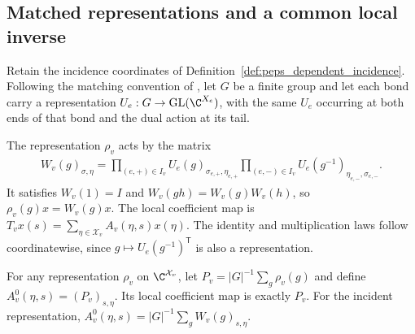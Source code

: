 \subsection{Matched representations and a common local inverse}
\label{sec:peps_dependent_projectors}

Retain the incidence coordinates of Definition~\ref{def:peps_dependent_incidence}.
Following the matching convention of \cite[Definition~5.1]{Schuch2010PEPS},
let $G$ be a finite group and let each bond carry a representation
$U_e:G\to\operatorname{GL}(\C^{X_e})$, with the same $U_e$ occurring at both
ends of that bond and the dual action at its tail.

\begin{definition}%
    \label{def:peps_dependent_incident_action}
    \leanok
    The representation $\rho_v$ acts by the matrix
    \begin{align}
        W_v(g)_{\sigma,\eta}
        =\prod_{(e,+)\in I_v}U_e(g)_{\sigma_{e,+},\eta_{e,+}}
        \prod_{(e,-)\in I_v}U_e(g^{-1})_{\eta_{e,-},\sigma_{e,-}}.
        \label{eq:peps_dependent_incident_action}
    \end{align}
    It satisfies $W_v(1)=I$ and $W_v(gh)=W_v(g)W_v(h)$, so
    $\rho_v(g)x=W_v(g)x$. The local coefficient map is
    $T_vx(s)=\sum_{\eta\in\mathcal X_v}A_v(\eta,s)x(\eta)$.
    The identity and multiplication laws follow coordinatewise, since
    $g\mapsto U_e(g^{-1})^{\mathsf T}$ is also a representation.
\end{definition}

\begin{definition}%
    \label{def:peps_dependent_averaging_site}
    \leanok
    For any representation $\rho_v$ on $\C^{\mathcal X_v}$, let
    $P_v=|G|^{-1}\sum_g\rho_v(g)$ and define
    $A_v^0(\eta,s)=(P_v)_{s,\eta}$. Its local coefficient map is exactly
    $P_v$. For the incident representation,
    $A_v^0(\eta,s)=|G|^{-1}\sum_gW_v(g)_{s,\eta}$.
\end{definition}

